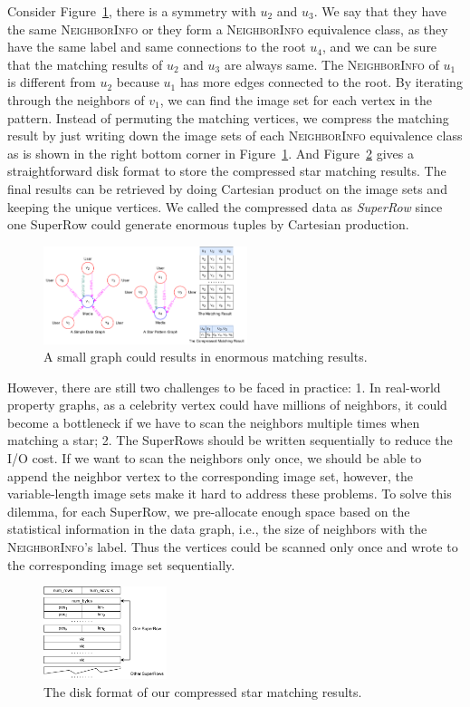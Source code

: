 Consider Figure~\ref{img:compress_example}, there is a symmetry with $u_2$ and $u_3$.
We say that they have the same \textsc{NeighborInfo} or they form a \textsc{NeighborInfo} equivalence class, as they have the same label and same connections to the root $u_4$,
and we can be sure that the matching results of $u_2$ and $u_3$ are always same.
The \textsc{NeighborInfo} of $u_1$ is different from $u_2$ because $u_1$ has more edges connected to the root.
By iterating through the neighbors of $v_1$, we can find the image set for each vertex in the pattern.
Instead of permuting the matching vertices, we compress the matching result by just writing down the image sets of each \textsc{NeighborInfo} equivalence class as is shown in the right bottom corner in Figure~\ref{img:compress_example}.
And Figure~\ref{img:compress} gives a straightforward disk format to store the compressed star matching results.
The final results can be retrieved by doing Cartesian product on the image sets and keeping the unique vertices.
We called the compressed data as \emph{SuperRow} since one SuperRow could generate enormous tuples by Cartesian production.
\begin{figure}[ht]
  \centering
  \includegraphics[width=0.53\textwidth]{img/compress_example.pdf}
  \caption{A small graph could results in enormous matching results.}\label{img:compress_example}
\end{figure}

However, there are still two challenges to be faced in practice:
1. In real-world property graphs, as a celebrity vertex could have millions of neighbors, it could become a bottleneck if we have to scan the neighbors multiple times when matching a star;
2. The SuperRows should be written sequentially to reduce the I/O cost.
If we want to scan the neighbors only once, we should be able to append the neighbor vertex to the corresponding image set, however, the variable-length image sets make it hard to address these problems.
To solve this dilemma, for each SuperRow, we pre-allocate enough space based on the statistical information in the data graph, i.e., the size of neighbors with the \textsc{NeighborInfo}'s label.
Thus the vertices could be scanned only once and wrote to the corresponding image set sequentially.
\begin{figure}[ht]
  \centering
  \includegraphics[width=0.32\textwidth]{img/compress.pdf}
  \caption{The disk format of our compressed star matching results.}\label{img:compress}
\end{figure}
